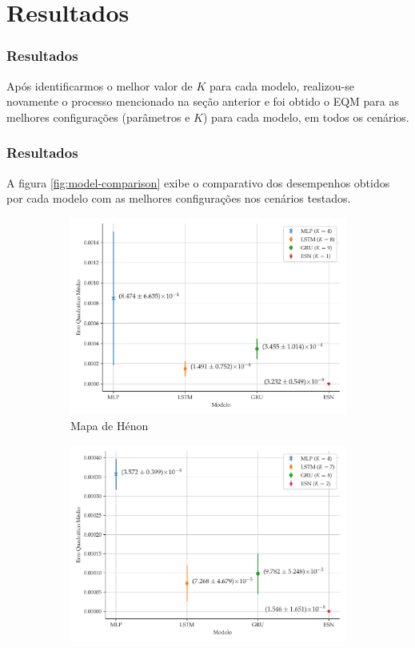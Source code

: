 \documentclass{beamer}
\begin{document}
\section{Resultados}

\begin{frame}
\frametitle{Resultados}
\justifying Após identificarmos o melhor valor de $K$ para cada modelo, realizou-se novamente o processo mencionado na seção anterior e foi obtido o EQM para as melhores configurações (parâmetros e $K$) para cada modelo, em todos os cenários. 
\end{frame}

\begin{frame}
\frametitle{Resultados}
\justifying A figura \ref{fig:model-comparison} exibe o comparativo dos desempenhos obtidos por cada modelo com as melhores configurações nos cenários testados.
\begin{figure}[!h]
     \begin{subfigure}[t]{0.4\textwidth}
     	\centering
         \includegraphics[scale=0.15]{comparacao-k-henon.pdf}
         \caption{Mapa de Hénon}
     \end{subfigure}
     \centering
     \begin{subfigure}[t]{0.4\textwidth} 
     \centering
         \includegraphics[scale=0.15]{comparacao-k-logistic.pdf}

\end{subfigure}
\end{figure}
\end{frame}
\end{document}
